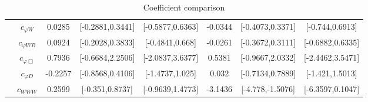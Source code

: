 \documentclass{article}
\begin{document}
\begin{table}[H]
\begin{tabular}{|c|c|c|c|c|c|c|c|}
 & $c_{\varphi W}$ & 0.0285                             & [-0.2881,0.3441]                                 & [-0.5877,0.6363] & -0.0344                             & [-0.4073,0.3371]                                 & [-0.744,0.6913] \\ \cline{2-8}
 & $c_{\varphi WB}$ & 0.0924                             & [-0.2028,0.3833]                                 & [-0.4841,0.668] & -0.0261                             & [-0.3672,0.3111]                                 & [-0.6882,0.6335] \\ \cline{2-8}
 & $c_{\varphi \Box}$ & 0.7936                             & [-0.6684,2.2506]                                 & [-2.0837,3.6377] & 0.5381                             & [-0.9667,2.0332]                                 & [-2.4462,3.5471] \\ \cline{2-8}
 & $c_{\varphi D}$ & -0.2257                             & [-0.8568,0.4106]                                 & [-1.4737,1.025] & 0.032                             & [-0.7134,0.7889]                                 & [-1.421,1.5013] \\ \cline{2-8}
 & $c_{WWW}$ & 0.2599                             & [-0.351,0.8737]                                 & [-0.9639,1.4773] & -3.1436                             & [-4.778,-1.5076]                                 & [-6.3597,0.1047] \\ \cline{2-8}
\hline
\end{tabular}
\caption{Coefficient comparison}
\end{table}
\end{document}
